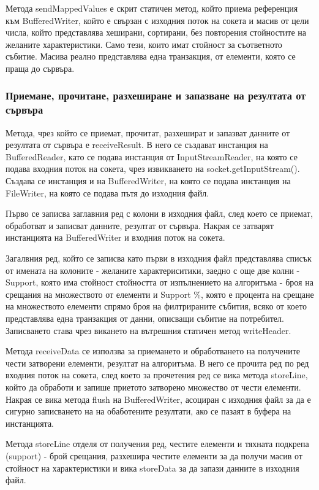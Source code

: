 \documentclass[a4paper, 12pt]{article}
\begin{document}
Метода sendMappedValues е скрит статичен метод, който приема референция към BufferedWriter,
който е свързан с изходния поток на сокета и масив от цели числа, който представлява хеширани, сортирани,
без повторения стойностите на желаните характеристики.
Само тези, които имат стойност за съответното събитие.
Масива реално представлява една транзакция, от елементи, която се праща до сървъра.

\subsubsection{Приемане, прочитане, разхеширане и запазване на резултата от сървъра}
Метода, чрез който се приемат, прочитат, разхешират и запазват данните от резултата от сървъра е receiveResult.
В него се създават инстанция на BufferedReader, като се подава инстанция от InputStreamReader,
на която се подава входния поток на сокета, чрез извикването на socket.getInputStream().
Създава се инстанция и на BufferedWriter, на която се подава инстанция на FileWriter, на която се подава пътя до изходния файл.

Първо се записва заглавния ред с колони в изходния файл, след което се приемат, обработват и записват данните, резултат от сървъра.
Накрая се затварят инстанцията на BufferedWriter и входния поток на сокета.

Загалвния ред, който се записва като първи в изходния файл представлява списък от имената на колоните - желаните характериситики,
заедно с още две колни - Support, която има стойност стойността от изпълнението на алгоритъма - броя на срещания на множеството от елементи и Support \%, която е процента на срещане на множеството елементи спрямо броя на филтрираните събития, всяко от което представлява една транзакция от данни, описващи събитие на потребител. Записването става чрез викането на вътрешния статичен метод writeHeader.

Метода receiveData се използва за приемането и обработването на получените чести затворени елементи, резултат на алгоритъма.
В него се прочита ред по ред входния поток на сокета, след което за прочетения ред се вика метода storeLine,
който да обработи и запише приетото затворено множество от чести елементи. Накрая се вика метода flush на BufferedWriter,
асоциран с изходния файл за да е сигурно записването на на обаботените резултати, ако се пазаят в буфера на инстанцията.

Метода storeLine отделя от получения ред, честите елементи и тяхната подкрепа (support) - брой срещания,
разхешира честите елементи за да получи масив от стойност на характеристики и вика storeData за да запази данните в изходния файл.
\end{document}
